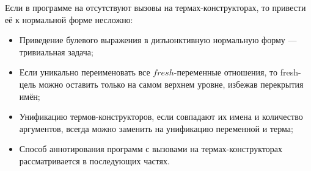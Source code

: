 Если в программе на \miniKanren{} отсутствуют вызовы на термах-конструкторах, то привести её к нормальной форме несложно:
\begin{itemize}
    \item Приведение булевого выражения в дизъюнктивную нормальную форму --- тривиальная задача;
    \item Если уникально переименовать все $fresh$-переменные отношения, то fresh-цель можно оставить только на самом верхнем уровне, избежав перекрытия имён;
    \item Унификацию термов-конструкторов, если совпадают их имена и количество аргументов, всегда можно заменить на унификацию переменной и терма;
    \item Способ аннотирования программ с вызовами на термах-конструкторах рассматривается в последующих частях.
\end{itemize}

